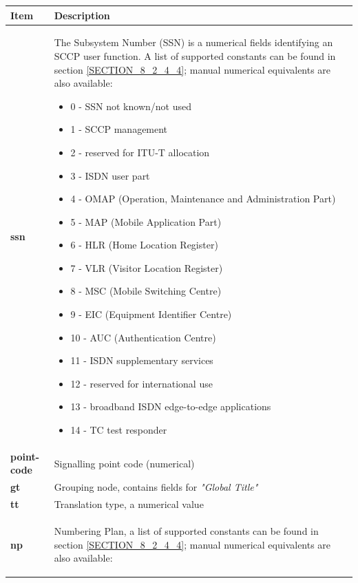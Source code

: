 \documentclass[a4paper,latin]{paper}
\begin{document}
\noindent\begin{tabularx}{\textwidth}{ | l | X |}
	\hline
	Item	 				& Description \\
	\hline
	\textbf{ssn}				& The Subsystem Number (SSN) is a numerical fields identifying an SCCP user function. A list of supported constants can be found in
                                                  section \ref{SECTION_8_2_4_4}; manual numerical equivalents are also available:
						  \begin{itemize}
							\setlength{\itemsep}{0pt}
							\setlength{\parskip}{0pt}
							\setlength{\parsep}{0pt} 
							\item 0 - SSN not known/not used
							\item 1 - SCCP management
							\item 2 - reserved for ITU-T allocation
							\item 3 - ISDN user part
							\item 4 - OMAP (Operation, Maintenance and Administration Part)
							\item 5 - MAP (Mobile Application Part)
							\item 6 - HLR (Home Location Register)
							\item 7 - VLR (Visitor Location Register)
							\item 8 - MSC (Mobile Switching Centre)
							\item 9 - EIC (Equipment Identifier Centre)
							\item 10 - AUC (Authentication Centre) 
							\item 11 - ISDN supplementary services
							\item 12 - reserved for international use
							\item 13 - broadband ISDN edge-to-edge applications
							\item 14 - TC test responder
						  \end{itemize} \\ 
	\textbf{point-code}			& Signalling point code (numerical) \\ 
	\textbf{gt}				& Grouping node, contains fields for \textit{"Global Title"} \\ 
	\textbf{tt}				& Translation type, a numerical value \\
	\textbf{np}				& Numbering Plan, a list of supported constants can be found in
                                                  section \ref{SECTION_8_2_4_4}; manual numerical equivalents are also available:
						  \begin{itemize}

\end{itemize}
\end{tabularx}
\end{document}
